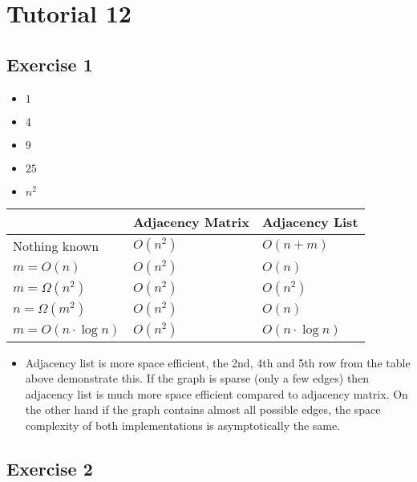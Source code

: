 \documentclass[english]{article}
\begin{document}

\pagestyle{fancy}
 \chead{}



\section*{Tutorial 12}
\subsection*{Exercise 1}
\begin{itemize}
\item $1$
\item $4$
\item $9$
\item $25$
\item $n^2$
\end{itemize}

\begin{tabular}{l|ll}
 & Adjacency Matrix & Adjacency List \\
 \hline
Nothing known & $O(n^2)$ & $O(n+m)$ \\
$m= O(n)$ & $O(n^2)$ & $O(n)$ \\
$m=\Omega(n^2)$ & $O(n^2)$ & $O(n^2)$ \\
$n=\Omega(m^2)$ & $O(n^2)$ & $O(n)$ \\
$m=O(n \cdot \log n)$ & $O(n^2)$ & $O(n \cdot \log n)$\\
\end{tabular}

\begin{itemize}
\item
Adjacency list is more space efficient, the 2nd, 4th and 5th row 
from the table above demonstrate this. If the graph is sparse
(only a few edges) then adjacency list is much more space efficient
compared to adjacency matrix. On the other hand if the graph contains
almost all possible edges, the space complexity of both implementations
is asymptotically the same. 
 \end{itemize}
\subsection*{Exercise 2}
\end{document}
